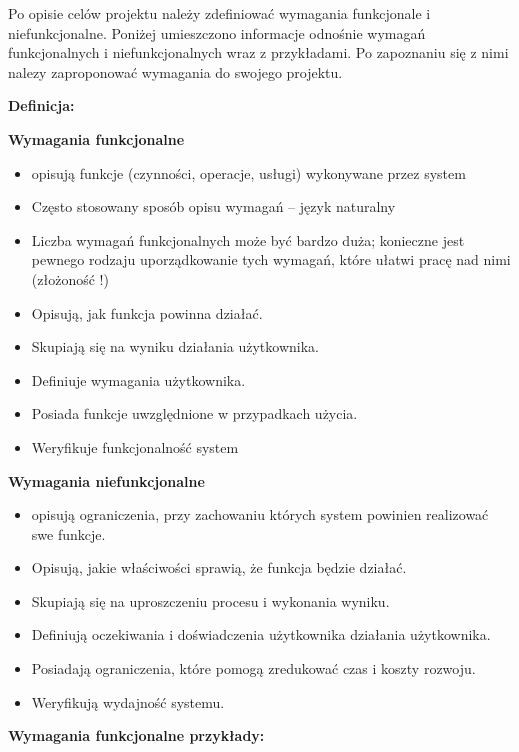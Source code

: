 Po opisie celów projektu należy zdefiniować wymagania funkcjonale i niefunkcjonalne. Poniżej umieszczono informacje odnośnie wymagań funkcjonalnych i niefunkcjonalnych wraz z przykładami. Po zapoznaniu się z nimi nalezy zaproponować wymagania do swojego projektu. 

\noindent \textbf{Definicja:}

\noindent \textbf{Wymagania funkcjonalne}
\begin{itemize}
    \item opisują funkcje (czynności, operacje, usługi) wykonywane przez system
    \item Często stosowany sposób opisu wymagań – język naturalny
    \item Liczba wymagań funkcjonalnych może być bardzo duża; konieczne jest pewnego rodzaju uporządkowanie tych wymagań, które ułatwi pracę nad nimi (złożoność !) 
    \item Opisują, jak funkcja powinna działać.
    \item Skupiają się na wyniku działania użytkownika.
    \item Definiuje wymagania użytkownika.
    \item Posiada funkcje uwzględnione w przypadkach użycia.
    \item Weryfikuje funkcjonalność system
\end{itemize}

\noindent \textbf{Wymagania niefunkcjonalne }
\begin{itemize}
    \item opisują ograniczenia, przy zachowaniu których system powinien realizować swe funkcje.     
    \item Opisują, jakie właściwości sprawią, że funkcja będzie działać.
    \item Skupiają się na uproszczeniu procesu i wykonania wyniku.
    \item Definiują oczekiwania i doświadczenia użytkownika działania użytkownika.
    \item Posiadają ograniczenia, które pomogą zredukować czas i koszty rozwoju.
    \item Weryfikują wydajność systemu.
\end{itemize}
 
\noindent \textbf{Wymagania funkcjonalne przykłady:}

